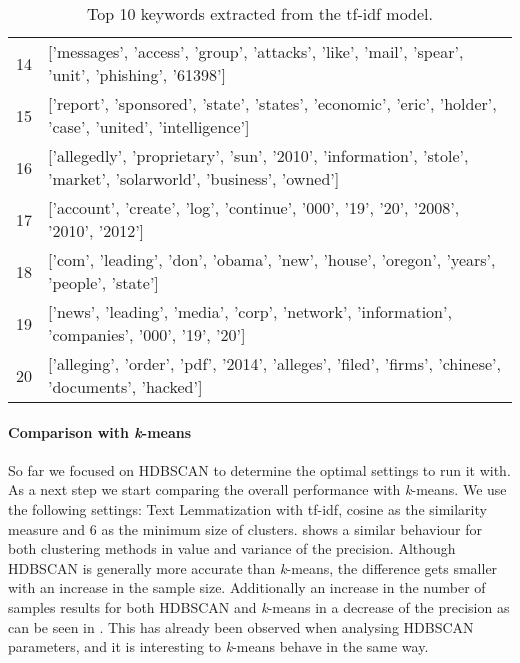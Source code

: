\begin{table}[h]
{\begin{tabular}{rl}
            14 & ['messages', 'access', 'group', 'attacks', 'like', 'mail', 'spear', 'unit', 'phishing', '61398']                        \\
            15 & ['report', 'sponsored', 'state', 'states', 'economic', 'eric', 'holder', 'case', 'united', 'intelligence']              \\
            16 & ['allegedly', 'proprietary', 'sun', '2010', 'information', 'stole', 'market', 'solarworld', 'business', 'owned']        \\
            17 & ['account', 'create', 'log', 'continue', '000', '19', '20', '2008', '2010', '2012']                                     \\
            18 & ['com', 'leading', 'don', 'obama', 'new', 'house', 'oregon', 'years', 'people', 'state']                                \\
            19 & ['news', 'leading', 'media', 'corp', 'network', 'information', 'companies', '000', '19', '20']                          \\
            20 & ['alleging', 'order', 'pdf', '2014', 'alleges', 'filed', 'firms', 'chinese', 'documents', 'hacked']                     \\
        \hline
        \end{tabular}
        }
        \caption{Top 10 keywords extracted from the tf-idf model.}
        \label{tab:clustering_example_features}
\end{table}

\paragraph{Comparison with \textit{k}-means}
So far we focused on HDBSCAN to determine the optimal settings to run it with.
As a next step we start comparing the overall performance with \textit{k}-means.
We use the following settings: Text Lemmatization with tf-idf,
cosine as the similarity measure and 6 as the minimum size of clusters.
 shows a similar behaviour
for both clustering methods in value and variance of the precision.
Although HDBSCAN is generally more accurate than \textit{k}-means,
the difference gets smaller with an increase in the sample size.
Additionally an increase in the number of samples results for both HDBSCAN
and \textit{k}-means in a decrease of the precision
as can be seen in .
This has already been observed when analysing HDBSCAN parameters, 
and it is interesting to \textit{k}-means behave in the same way.

